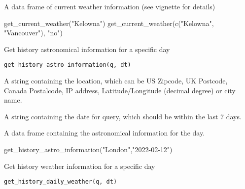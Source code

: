 \documentclass[a4paper]{book}
\begin{document}
%
\begin{Value}
A data frame of current weather information (see vignette for details)
\end{Value}
%
\begin{Examples}
\begin{ExampleCode}
get_current_weather("Kelowna")
get_current_weather(c("Kelowna", "Vancouver"), "no")
\end{ExampleCode}
\end{Examples}
%
\begin{Description}\relax
Get history astronomical information for a specific day
\end{Description}
%
\begin{Usage}
\begin{verbatim}
get_history_astro_information(q, dt)
\end{verbatim}
\end{Usage}
%
\begin{Arguments}
\begin{ldescription}
\item[\code{q}] A string containing the location, which can be US Zipcode, UK Postcode, Canada Postalcode, IP address, Latitude/Longitude (decimal degree) or city name.

\item[\code{dt}] A string containing the date for query, which should be within the last 7 days.
\end{ldescription}
\end{Arguments}
%
\begin{Value}
A data frame containing the astronomical information for the day.
\end{Value}
%
\begin{Examples}
\begin{ExampleCode}
get_history_astro_information("London","2022-02-12")
\end{ExampleCode}
\end{Examples}
%
\begin{Description}\relax
Get history weather information for a specific day
\end{Description}
%
\begin{Usage}
\begin{verbatim}
get_history_daily_weather(q, dt)
\end{verbatim}
\end{Usage}
\end{document}
